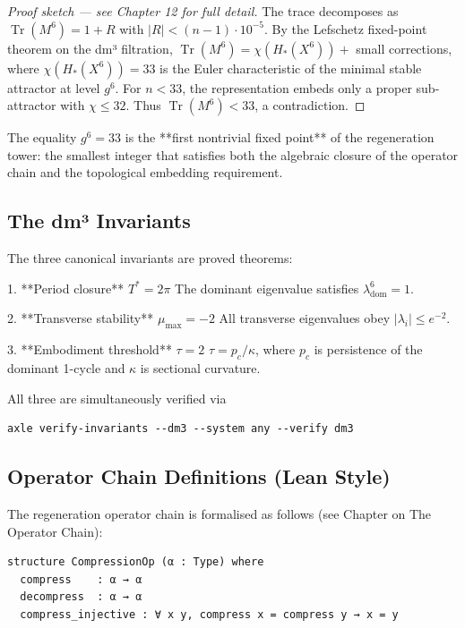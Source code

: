 \documentclass[19pt]{book}
\theoremstyle{plain}
\theoremstyle{definition}
\theoremstyle{remark}
\begin{document}
\begin{enumerate}
\begin{proof}[Proof sketch — see Chapter 12 for full detail]
The trace decomposes as \(\operatorname{Tr}(M^6) = 1 + R\) with \(|R| < (n-1) \cdot 10^{-5}\).  
By the Lefschetz fixed-point theorem on the dm³ filtration, \(\operatorname{Tr}(M^6) = \chi(H_*(X^6)) +\) small corrections, where \(\chi(H_*(X^6)) = 33\) is the Euler characteristic of the minimal stable attractor at level \(g^6\).  
For \(n < 33\), the representation embeds only a proper sub-attractor with \(\chi \le 32\). Thus \(\operatorname{Tr}(M^6) < 33\), a contradiction.
\end{proof}

The equality \(g^6 = 33\) is the **first nontrivial fixed point** of the regeneration tower: the smallest integer that satisfies both the algebraic closure of the operator chain and the topological embedding requirement.

\subsection{The dm³ Invariants}

The three canonical invariants are proved theorems:

1. **Period closure** \(T^* = 2\pi\)  
   The dominant eigenvalue satisfies \(\lambda_{\mathrm{dom}}^6 = 1\).

2. **Transverse stability** \(\mu_{\max} = -2\)  
   All transverse eigenvalues obey \(|\lambda_i| \le e^{-2}\).

3. **Embodiment threshold** \(\tau = 2\)  
   \(\tau = p_c / \kappa\), where \(p_c\) is persistence of the dominant 1-cycle and \(\kappa\) is sectional curvature.

All three are simultaneously verified via  
\begin{verbatim}
axle verify-invariants --dm3 --system any --verify dm3
\end{verbatim}

\subsection{Operator Chain Definitions (Lean Style)}

The regeneration operator chain is formalised as follows (see Chapter on The Operator Chain):

\begin{lstlisting}[language=Lean,caption={Core Operator Types in AXLE}]
structure CompressionOp (α : Type) where
  compress    : α → α
  decompress  : α → α
  compress_injective : ∀ x y, compress x = compress y → x = y


\end{lstlisting}
\end{enumerate}
\end{document}
